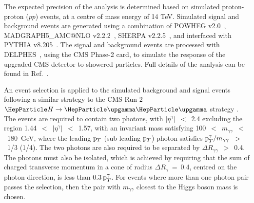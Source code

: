 The expected precision of the analysis is determined based on simulated proton-proton ($pp$) events, at a centre of mass energy of 14 TeV.
Simulated signal and background events are generated using a combination of {\sc POWHEG}
v2.0~\cite{Alioli:2010xd,Nason:2009ai}, {\sc MADGRAPH5\_AMC@NLO} v2.2.2~\cite{Alwall:2014hca}, {\sc SHERPA} v2.2.5~\cite{Gleisberg:2008ta}, and interfaced with {\sc PYTHIA} v8.205~\cite{Sjostrand:2007gs}. The signal and background events are processed with {\sc DELPHES}~\cite{deFavereau:2013fsa}, using the CMS Phase-2 card, to simulate the response of the upgraded CMS detector to showered particles. Full details of the analysis can be found in Ref.~\cite{CMS-PAS-FTR-18-020}.


An event selection is applied to the simulated background and signal events following a similar strategy to the CMS Run 2 $\hgg$ strategy \cite{Sirunyan:2018ouh}. The events are required to contain two photons, with $|\eta^\gamma|$~$<$~2.4 excluding the region 1.44~$<$~$|\eta^\gamma|$~$<$~1.57, with an invariant mass satisfying 100~$<$~$m_{\gamma\gamma}$~$<$~180~GeV, where the leading-$\mathrm{p}_{T}$ (sub-leading-$\mathrm{p}_{T}$) photon satisfies $\mathrm{p}_{T}^{\gamma}/m_{\gamma\gamma}$~$>$~1/3 (1/4). The two photons are also required to be separated by $\Delta R_{\gamma\gamma}$~$>$~0.4. The photons must also be isolated, which is achieved by requiring that the sum of charged transverse momentum in a cone of radius $\Delta R_{\gamma}$~=~0.4, centred on the photon direction, is less than 0.3$\, \mathrm{p}_{T}^\gamma$. For events where more than one photon pair passes the selection, then the pair with $m_{\gamma\gamma}$ closest to the Higgs boson mass is chosen.

